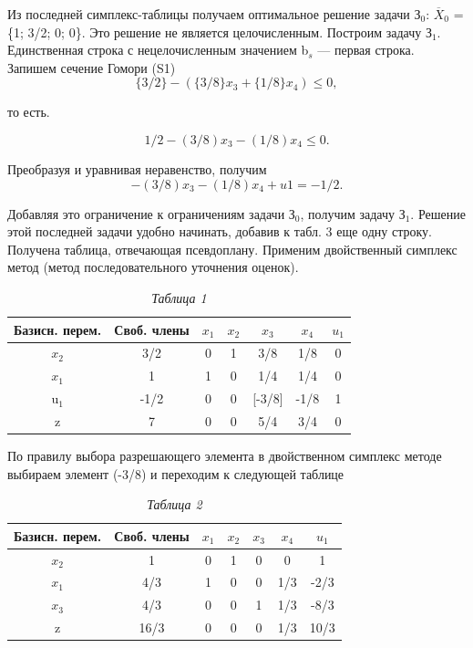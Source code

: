 Из последней симплекс-таблицы получаем оптимальное решение задачи З$_0$: $\overline{X}_0$ = \{1; 3/2; 0; 0\}.   Это решение не является целочисленным. Построим задачу З$_1$. Единственная строка с нецелочисленным значением b$_s$ — первая строка. Запишем сечение Гомори (S1)
$$
\{3/2\}-(\{3/8\}x_3+\{1/8\}x_4)\leq0,
$$
\begin{flushleft}
то есть.
\end{flushleft}
$$
1/2-(3/8)x_3-(1/8)x_4\leq0.
$$

Преобразуя и уравнивая неравенство, получим
$$
-(3/8)x_3-(1/8)x_4+u1=-1/2.
$$

Добавляя это ограничение к ограничениям задачи З$_0$, получим задачу З$_1$. Решение этой последней задачи удобно начинать, добавив к табл. 3 еще одну строку. Получена таблица, отвечающая псевдоплану. Применим двойственный симплекс метод (метод последовательного уточнения оценок).

\begin{table}[h]
\label{table_5_9}
\caption*{\hspace{0.8\linewidth} \textit{Таблица 1}}
\centering
\begin{tabular}{|c|*{6}{c|}}
\hline
\parbox{1.9cm}{\centering Базисн. перем.}& \parbox{1.9cm}{\centering Своб. члены} & \parbox{1cm}{\centering $x_1$} & \parbox{1cm}{\centering $x_2$} & \parbox{1cm}{\centering $x_3$} & \parbox{1cm}{\centering $x_4$} & \parbox{1cm}{\centering $u_1$}\\
\hline
$x_2$ & 3/2 & 0 & 1 & 3/8 & 1/8 & 0\\
\hline
$x_1 $ & 1 & 1 & 0 & 1/4 & 1/4 & 0 \\
\hline
{}u$_1$ & -1/2 & 0 & 0 &[-3/8] & -1/8 & 1\\
\hline
z & 7 & 0 & 0 & 5/4 & 3/4 & 0\\
\hline
\end{tabular}
\end{table}

По правилу выбора разрешающего элемента в двойственном симплекс методе выбираем элемент (-3/8) и переходим к следующей таблице

\begin{table}[h]
\label{table_5_10}
\caption*{\hspace{0.8\linewidth} \textit{Таблица 2}}
\centering
\begin{tabular}{|c|*{6}{c|}}
\hline
\parbox{1.9cm}{\centering Базисн. перем.}& \parbox{1.9cm}{\centering Своб. члены} & \parbox{1cm}{\centering $x_1$} & \parbox{1cm}{\centering $x_2$} & \parbox{1cm}{\centering $x_3$} & \parbox{1cm}{\centering $x_4$} & \parbox{1cm}{\centering $u_1$}\\
\hline
$x_2$ & 1 & 0 & 1 & 0 & 0 & 1\\
\hline
$x_1$ & 4/3 & 1 & 0 & 0 & 1/3 & -2/3 \\
\hline
$x_3$ & 4/3 & 0 & 0 & 1 & 1/3 & -8/3\\
\hline
z & 16/3 & 0 & 0 & 0 & 1/3 & 10/3\\
\hline
\end{tabular}
\end{table}


